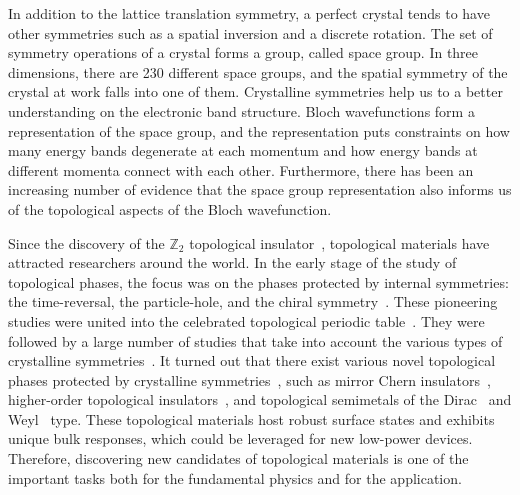 \documentclass[3p,preprint]{elsarticle}
\newcommand{\mZ}{\mathbb{Z}}
\begin{document}
In addition to the lattice translation symmetry, a perfect crystal tends to have other symmetries such as a spatial inversion and a discrete rotation. The set of symmetry operations of a crystal forms a group, called space group. In three dimensions, there are 230 different space groups, and the spatial symmetry of the crystal at work falls into one of them.  Crystalline symmetries help us to a better understanding on the electronic band structure. Bloch wavefunctions form a representation of the space group, and the representation puts constraints on how many energy bands degenerate at each momentum and how energy bands at different momenta connect with each other.  Furthermore,  there has been an increasing number of evidence that the space group representation also informs us of the topological aspects of the Bloch wavefunction.

Since the discovery of the $\mZ_2$ topological insulator~\cite{PhysRevLett.95.146802,PhysRevLett.95.226801}, topological materials have attracted researchers around the world. 
In the early stage of the study of topological phases, the focus was on the phases protected by internal symmetries: the time-reversal, the particle-hole, and the chiral symmetry~\cite{Bernevig1757, Konig766,PhysRevB.74.195312,PhysRevLett.98.106803, PhysRevB.75.121306,Fu-Kane, Hsieh:2008aa,PhysRevLett.100.236601,PhysRevB.78.195424,Hsieh:2009aa,Xia:2009aa,PhysRevB.79.195322,Yu61,PhysRevLett.107.136603,Chang167}. These pioneering studies were united into the celebrated topological periodic table~\cite{PhysRevB.78.195125, doi:10.1063/1.3149495,Ryu_2010}.  They were followed by a large number of studies that take into account the various types of crystalline symmetries~\cite{PhysRevLett.106.106802,Freed2013,PhysRevB.88.125129, PhysRevB.88.075142,PhysRevB.90.205136, PhysRevB.90.165114,PhysRevB.91.155120,PhysRevB.93.195413,PhysRevB.95.235425, Wang:2016aa,PhysRevB.91.161105, PhysRevX.7.011020, PhysRevX.7.041069, PhysRevX.8.011040,PhysRevB.96.205106, Shiozaki2018, Song2018}.  It turned out that there exist various novel topological phases protected by crystalline symmetries~\cite{PhysRevLett.106.106802,PhysRevB.90.165114,PhysRevB.91.155120,PhysRevB.93.195413,PhysRevB.95.235425,Wang:2016aa,PhysRevLett.119.246402,PhysRevLett.119.246401,Benalcazar61,Fang2017}, such as mirror Chern insulators~\cite{Tanaka:2012aa,Hsieh:2012aa}, higher-order topological insulators~\cite{PhysRevLett.119.246402,Benalcazar61,Fang2017,Schindlereaat0346,PhysRevB.96.245115, PhysRevB.98.205129, PhysRevX.9.011012}, and topological semimetals of the Dirac~\cite{PhysRevLett.108.140405} and Weyl~\cite{PhysRevB.83.205101} type.  These topological materials host robust surface states and exhibits unique bulk responses, which could be leveraged for new low-power devices. Therefore, discovering new candidates of topological materials is one of the important tasks both for the fundamental physics and for the application.
\end{document}
